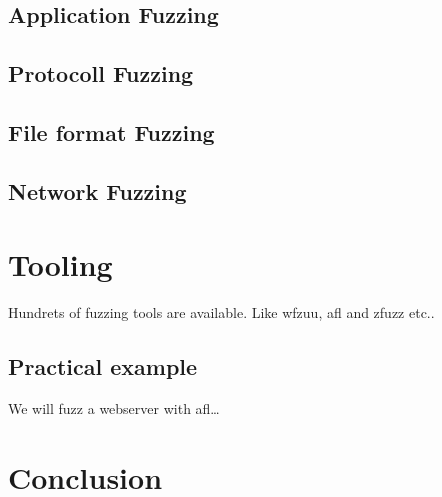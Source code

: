 \documentclass[journal=tosc,final]{iacrtrans}
\begin{document}
\subsection{Application Fuzzing}

\subsection{Protocoll Fuzzing}
\subsection{File format Fuzzing}
\subsection{Network Fuzzing}
\newpage
\section{Tooling}
Hundrets of fuzzing tools are available. Like wfzuu, afl and zfuzz etc..
\subsection{Practical example}
We will fuzz a webserver with afl\dots
\section{Conclusion}





\end{document}
